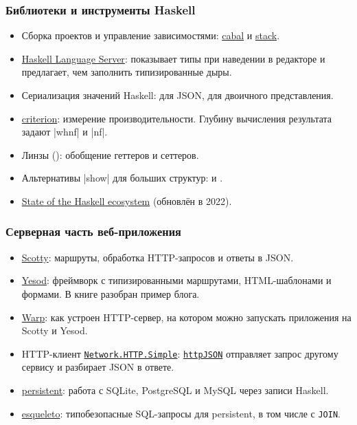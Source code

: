\documentclass[11pt]{beamer}
\begin{document}
\begin{frame}[fragile]
  \frametitle{Библиотеки и инструменты Haskell}
  \small
  \begin{itemize}
    \setlength{\itemsep}{0pt}
    \item Сборка проектов и управление зависимостями: \href{https://cabal.readthedocs.io/en/stable/}{cabal} и \href{https://docs.haskellstack.org/en/stable/}{stack}.
    \item \href{https://haskell-language-server.readthedocs.io/en/latest/features.html}{Haskell Language Server}: показывает типы при наведении в редакторе и предлагает, чем заполнить типизированные дыры.
    \item Сериализация значений Haskell:  для JSON,  для двоичного представления.
    \item \href{https://hackage.haskell.org/package/criterion/docs/Criterion-Main.html}{criterion}: измерение производительности. Глубину вычисления результата задают \haskinline|whnf| и \haskinline|nf|.
    \item Линзы (): обобщение геттеров и сеттеров.
    \item Альтернативы \haskinline|show| для больших структур:  и .
    \item \href{https://github.com/Gabriella439/post-rfc/blob/main/sotu.md}{State of the Haskell ecosystem} (обновлён в 2022).
  \end{itemize}
\end{frame}

\begin{frame}
  \frametitle{Серверная часть веб-приложения}
  \begin{itemize}
    \item \href{https://github.com/scotty-web/scotty/tree/master/examples}{Scotty}: маршруты, обработка HTTP-запросов и ответы в JSON.
    \item \href{https://www.yesodweb.com/book}{Yesod}: фреймворк с типизированными маршрутами, HTML-шаблонами и формами. В книге разобран пример блога.
    \item \href{https://aosabook.org/en/posa/warp.html}{Warp}: как устроен HTTP-сервер, на котором можно запускать приложения на Scotty и Yesod.
    \item HTTP-клиент \href{https://hackage.haskell.org/package/http-conduit/docs/Network-HTTP-Simple.html}{\texttt{Network.HTTP.Simple}}: \href{https://hackage.haskell.org/package/http-conduit/docs/Network-HTTP-Simple.html\#v:httpJSON}{\texttt{httpJSON}} отправляет запрос другому сервису и разбирает JSON в ответе.
    \item \href{https://www.yesodweb.com/book/persistent}{persistent}: работа с SQLite, PostgreSQL и MySQL через записи Haskell.
    \item \href{https://github.com/bitemyapp/esqueleto}{esqueleto}: типобезопасные SQL-запросы для persistent, в том числе с \texttt{JOIN}.
  \end{itemize}
\end{frame}
\end{document}
